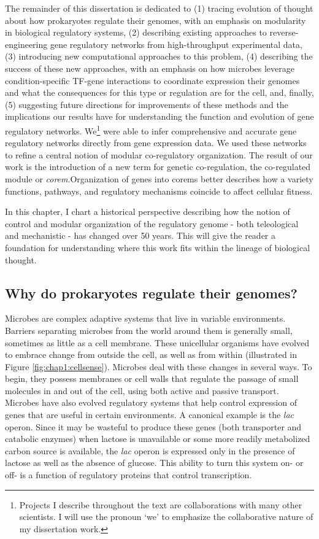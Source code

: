 The remainder of this dissertation is dedicated to (1) tracing evolution of thought about how prokaryotes regulate their genomes, with an emphasis on modularity in biological regulatory systems, (2) describing existing approaches to reverse-engineering gene regulatory networks from high-throughput experimental data, (3) introducing new computational approaches to this problem, (4) describing the success of these new approaches, with an emphasis on how microbes leverage condition-specific TF-gene interactions to coordinate expression their genomes and what the consequences for this type or regulation are for the cell, and, finally, (5) suggesting future directions for improvements of these methods and the implications our results have for understanding the function and evolution of gene regulatory networks.  We\footnote{Projects I describe throughout the text are collaborations with many other scientists. I will use the pronoun `we' to emphasize the collaborative nature of my dissertation work.}  were able to infer comprehensive and accurate gene regulatory networks directly from gene expression data.  We used these networks to refine a central notion of modular co-regulatory organization. The result of our work is the introduction of a new term for genetic co-regulation, the co-regulated module or \textit{corem}.Organization of genes into corems better describes how a variety functions, pathways, and regulatory mechanisms coincide to affect cellular fitness.

In this chapter, I chart a historical perspective describing how the notion of control and modular organization of the regulatory genome - both teleological and mechanistic - has changed over 50 years. This will give the reader a foundation for understanding where this work fits within the lineage of biological thought. 

\subsection{Why do prokaryotes regulate their genomes?}

Microbes are complex adaptive systems that live in variable environments. Barriers separating microbes from the world around them is generally small, sometimes as little as a cell membrane. These unicellular organisms have evolved to embrace change from outside the cell, as well as from within (illustrated in Figure \ref{fig:chap1:cellsense}). Microbes deal with these changes in several ways. To begin, they possess membranes or cell walls that regulate the passage of small molecules in and out of the cell, using both active and passive transport. Microbes have also evolved regulatory systems that help control expression of genes that are useful in certain environments. A canonical example is the \textit{lac} operon. Since it may be wasteful to produce these genes (both transporter and catabolic enzymes) when lactose is unavailable or some more readily metabolized carbon source is available, the \textit{lac} operon is expressed only in the presence of lactose as well as the absence of glucose. This ability to turn this system on- or off- is a function of regulatory proteins that control transcription. 

